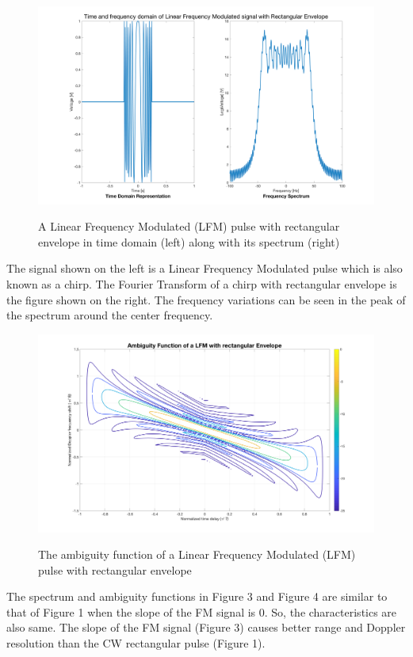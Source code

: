 \begin{figure}[H]
\centering
{\includegraphics[scale=0.18]{usp8_2.png}}
\caption{ A Linear Frequency Modulated (LFM) pulse with rectangular envelope in time domain (left) along with its spectrum (right)}
\end{figure}

\noindent The signal shown on the left is a Linear Frequency Modulated pulse which is also known as a chirp. The Fourier Transform of a chirp with rectangular envelope is the figure shown on the right. The frequency variations can be seen in the peak of the spectrum around the center frequency.

\begin{figure}[H]
\centering
{\includegraphics[scale=0.18]{usp8_5.png}}
\caption{ The ambiguity function of a Linear Frequency Modulated (LFM) pulse with rectangular envelope }
\end{figure}

\noindent  The spectrum and ambiguity functions in Figure 3 and Figure 4 are similar to that of Figure 1 when the slope of the FM signal is 0. So, the characteristics are also same. The slope of the FM signal (Figure 3) causes better range and Doppler resolution than the CW rectangular pulse (Figure 1).


